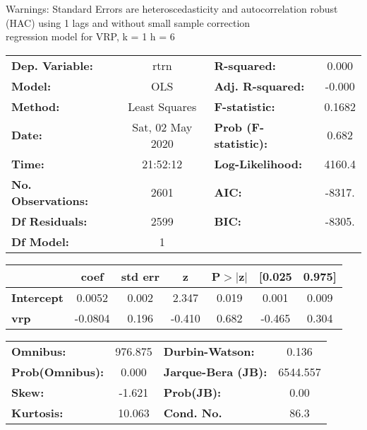 Warnings: \newline
 [1] Standard Errors are heteroscedasticity and autocorrelation robust (HAC) using 1 lags and without small sample correction\\ 

regression model for VRP, k = 1 h = 6\begin{center}
\begin{tabular}{lclc}
\toprule
\textbf{Dep. Variable:}    &       rtrn       & \textbf{  R-squared:         } &     0.000   \\
\textbf{Model:}            &       OLS        & \textbf{  Adj. R-squared:    } &    -0.000   \\
\textbf{Method:}           &  Least Squares   & \textbf{  F-statistic:       } &    0.1682   \\
\textbf{Date:}             & Sat, 02 May 2020 & \textbf{  Prob (F-statistic):} &    0.682    \\
\textbf{Time:}             &     21:52:12     & \textbf{  Log-Likelihood:    } &    4160.4   \\
\textbf{No. Observations:} &        2601      & \textbf{  AIC:               } &    -8317.   \\
\textbf{Df Residuals:}     &        2599      & \textbf{  BIC:               } &    -8305.   \\
\textbf{Df Model:}         &           1      & \textbf{                     } &             \\
\bottomrule
\end{tabular}
\begin{tabular}{lcccccc}
                   & \textbf{coef} & \textbf{std err} & \textbf{z} & \textbf{P$> |$z$|$} & \textbf{[0.025} & \textbf{0.975]}  \\
\midrule
\textbf{Intercept} &       0.0052  &        0.002     &     2.347  &         0.019        &        0.001    &        0.009     \\
\textbf{vrp}       &      -0.0804  &        0.196     &    -0.410  &         0.682        &       -0.465    &        0.304     \\
\bottomrule
\end{tabular}
\begin{tabular}{lclc}
\textbf{Omnibus:}       & 976.875 & \textbf{  Durbin-Watson:     } &    0.136  \\
\textbf{Prob(Omnibus):} &   0.000 & \textbf{  Jarque-Bera (JB):  } & 6544.557  \\
\textbf{Skew:}          &  -1.621 & \textbf{  Prob(JB):          } &     0.00  \\
\textbf{Kurtosis:}      &  10.063 & \textbf{  Cond. No.          } &     86.3  \\
\bottomrule
\end{tabular}
\end{center}

